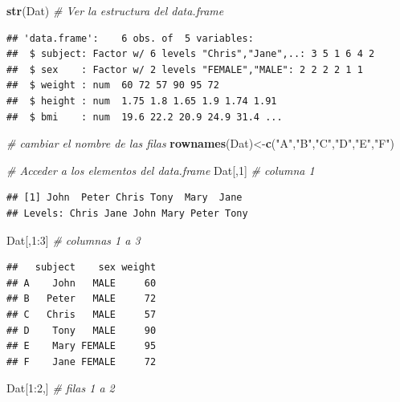 \documentclass[]{article}
\newenvironment{Shaded}{\begin{snugshade}}{\end{snugshade}}
\newcommand{\KeywordTok}[1]{\textcolor[rgb]{0.13,0.29,0.53}{\textbf{{#1}}}}
\newcommand{\DecValTok}[1]{\textcolor[rgb]{0.00,0.00,0.81}{{#1}}}
\newcommand{\StringTok}[1]{\textcolor[rgb]{0.31,0.60,0.02}{{#1}}}
\newcommand{\CommentTok}[1]{\textcolor[rgb]{0.56,0.35,0.01}{\textit{{#1}}}}
\newcommand{\NormalTok}[1]{{#1}}
\numberwithin{equation}{section}
\begin{document}
\begin{Shaded}
\begin{Highlighting}[]
\KeywordTok{str}\NormalTok{(Dat) }\CommentTok{# Ver la estructura del data.frame}
\end{Highlighting}
\end{Shaded}

\begin{verbatim}
## 'data.frame':    6 obs. of  5 variables:
##  $ subject: Factor w/ 6 levels "Chris","Jane",..: 3 5 1 6 4 2
##  $ sex    : Factor w/ 2 levels "FEMALE","MALE": 2 2 2 2 1 1
##  $ weight : num  60 72 57 90 95 72
##  $ height : num  1.75 1.8 1.65 1.9 1.74 1.91
##  $ bmi    : num  19.6 22.2 20.9 24.9 31.4 ...
\end{verbatim}

\begin{Shaded}
\begin{Highlighting}[]
\CommentTok{# cambiar el nombre de las filas}
\KeywordTok{rownames}\NormalTok{(Dat)<-}\KeywordTok{c}\NormalTok{(}\StringTok{"A"}\NormalTok{,}\StringTok{"B"}\NormalTok{,}\StringTok{"C"}\NormalTok{,}\StringTok{"D"}\NormalTok{,}\StringTok{"E"}\NormalTok{,}\StringTok{"F"}\NormalTok{)}

\CommentTok{# Acceder a los elementos del data.frame}
\NormalTok{Dat[,}\DecValTok{1}\NormalTok{]     }\CommentTok{# columna 1}
\end{Highlighting}
\end{Shaded}

\begin{verbatim}
## [1] John  Peter Chris Tony  Mary  Jane 
## Levels: Chris Jane John Mary Peter Tony
\end{verbatim}

\begin{Shaded}
\begin{Highlighting}[]
\NormalTok{Dat[,}\DecValTok{1}\NormalTok{:}\DecValTok{3}\NormalTok{]   }\CommentTok{# columnas 1 a 3}
\end{Highlighting}
\end{Shaded}

\begin{verbatim}
##   subject    sex weight
## A    John   MALE     60
## B   Peter   MALE     72
## C   Chris   MALE     57
## D    Tony   MALE     90
## E    Mary FEMALE     95
## F    Jane FEMALE     72
\end{verbatim}

\begin{Shaded}
\begin{Highlighting}[]
\NormalTok{Dat[}\DecValTok{1}\NormalTok{:}\DecValTok{2}\NormalTok{,]   }\CommentTok{# filas 1 a 2}
\end{Highlighting}
\end{Shaded}
\end{document}
